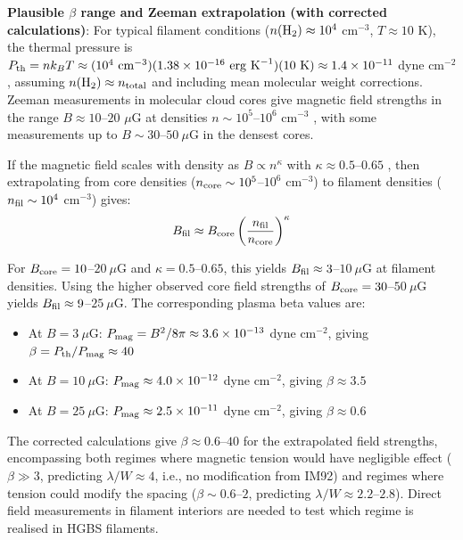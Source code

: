 \documentclass[11pt,a4paper]{article}
\begin{document}
\textbf{Plausible $\beta$ range and Zeeman extrapolation (with corrected calculations)}: For typical filament conditions ($n({\rm H_2}) \approx 10^4$ cm$^{-3}$, $T \approx 10$ K), the thermal pressure is $P_{\rm th} = n k_B T \approx (10^4~{\rm cm}^{-3})(1.38\times10^{-16}~{\rm erg~K}^{-1})(10~{\rm K}) \approx 1.4\times10^{-11}$ dyne cm$^{-2}$, assuming $n({\rm H}_2) \approx n_{\rm total}$ and including mean molecular weight corrections. Zeeman measurements in molecular cloud cores give magnetic field strengths in the range $B \approx 10$--$20$ $\mu$G at densities $n \sim 10^5$--$10^6$ cm$^{-3}$ \citep{Crutcher2012}, with some measurements up to $B \sim 30$--$50~\mu$G in the densest cores.

If the magnetic field scales with density as $B \propto n^{\kappa}$ with $\kappa \approx 0.5$--$0.65$ \citep{Crutcher2012}, then extrapolating from core densities ($n_{\rm core} \sim 10^5$--$10^6$ cm$^{-3}$) to filament densities ($n_{\rm fil} \sim 10^4$ cm$^{-3}$) gives:
\begin{equation}
B_{\rm fil} \approx B_{\rm core} \left(\frac{n_{\rm fil}}{n_{\rm core}}\right)^{\kappa}
\end{equation}

For $B_{\rm core} = 10$--$20~\mu$G and $\kappa = 0.5$--$0.65$, this yields $B_{\rm fil} \approx 3$--$10~\mu$G at filament densities. Using the higher observed core field strengths of $B_{\rm core} = 30$--$50~\mu$G yields $B_{\rm fil} \approx 9$--$25~\mu$G. The corresponding plasma beta values are:
\begin{itemize}
    \item At $B = 3~\mu$G: $P_{\rm mag} = B^2/8\pi \approx 3.6\times10^{-13}$ dyne cm$^{-2}$, giving $\beta = P_{\rm th}/P_{\rm mag} \approx 40$
    \item At $B = 10~\mu$G: $P_{\rm mag} \approx 4.0\times10^{-12}$ dyne cm$^{-2}$, giving $\beta \approx 3.5$
    \item At $B = 25~\mu$G: $P_{\rm mag} \approx 2.5\times10^{-11}$ dyne cm$^{-2}$, giving $\beta \approx 0.6$
\end{itemize}

The corrected calculations give $\beta \approx 0.6$--$40$ for the extrapolated field strengths, encompassing both regimes where magnetic tension would have negligible effect ($\beta \gg 3$, predicting $\lambda/W \approx 4$, i.e., no modification from IM92) and regimes where tension could modify the spacing ($\beta \sim 0.6$--$2$, predicting $\lambda/W \approx 2.2$--$2.8$). Direct field measurements in filament interiors are needed to test which regime is realised in HGBS filaments.
\end{document}
